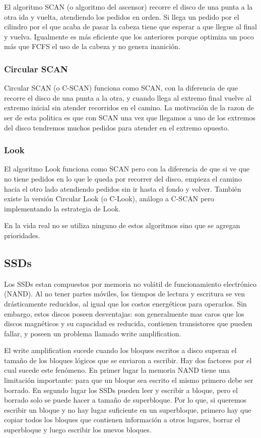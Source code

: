 \documentclass{article}
\begin{document}
El algoritmo SCAN (o algoritmo del ascensor) recorre el disco de una punta a la otra ida y vuelta, atendiendo los pedidos en orden. Si llega un pedido por el cilindro por el que acaba de pasar la cabeza tiene que esperar a que llegue al final y vuelva. Igualmente es m\'as eficiente que los anteriores porque optimiza un poco m\'as que FCFS el uso de la cabeza y no genera inanici\'on.

\subsubsection{Circular SCAN}

Circular SCAN (o C-SCAN) funciona como SCAN, con la diferencia de que recorre el disco de una punta a la otra, y cuando llega al extremo final vuelve al extremo inicial sin atender recorridos en el camino. La motivación de la razon de ser de esta politica es que con SCAN una vez que llegamos a uno de los extremos del disco tendremos muchos pedidos para atender en el extremo opuesto.

\subsubsection{Look}

El algoritmo Look funciona como SCAN pero con la diferencia de que si ve que no tiene pedidos en lo que le queda por recorrer del disco, empieza el camino hacia el otro lado atendiendo pedidos sin ir hasta el fondo y volver. Tambi\'en existe la versi\'on Circular Look (o C-Look), análogo a C-SCAN pero implementando la estrategia de Look.

En la vida real no se utiliza ninguno de estos algoritmos sino que se agregan prioridades.

\subsection{SSDs}

Los SSDs estan compuestos por memoria no volátil de funcionamiento electrónico (NAND). Al no tener partes móviles, los tiempos de lectura y escritura se ven drásticamente reducidos, al igual que los costos energéticos para operarlos. Sin embargo, estos discos poseen desventajas: son generalmente mas caros que los discos magnéticos y su capacidad es reducida, contienen transistores que pueden fallar, y poseen un problema llamado write amplification. 

El write amplification sucede cuando los bloques escritos a disco superan el tamaño de los bloques lógicos que se enviaron a escribir. Hay dos factores por el cual sucede este fenómeno. En primer lugar la memoria NAND tiene una limitación importante: para que un bloque sea escrito el mismo primero debe ser borrado. En segundo lugar los SSDs pueden leer y escribir a bloque, pero el borrado solo se puede hacer a tamaño de superbloque. Por lo que, si queremos escribir un bloque y no hay lugar suficiente en un superbloque, primero hay que copiar todos los bloques que contienen información a otros lugares, borrar el superbloque y luego escribir los nuevos bloques.
\end{document}
